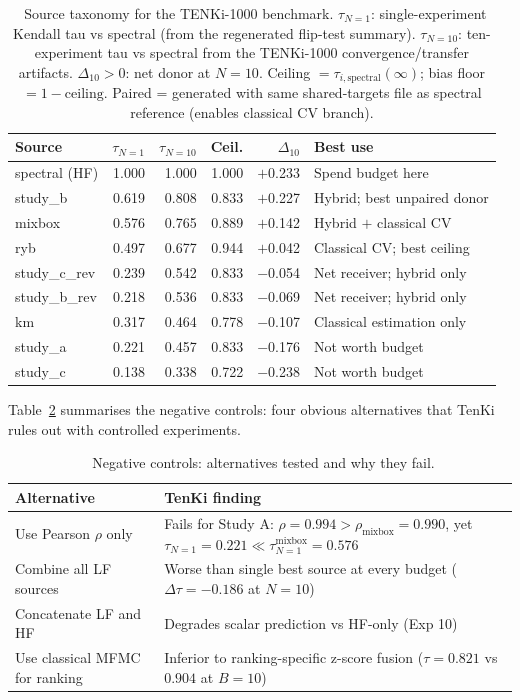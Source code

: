 \documentclass[twoside,twocolumn,9pt]{article}
\begin{document}
\begin{table}[h]
\small
\caption{\ Source taxonomy for the TENKi-1000 benchmark. $\tau_{N=1}$: single-experiment Kendall tau vs spectral (from the regenerated flip-test summary). $\tau_{N=10}$: ten-experiment tau vs spectral from the TENKi-1000 convergence/transfer artifacts. $\Delta_{10} > 0$: net donor at $N=10$. Ceiling $= \tau_{i,\mathrm{spectral}}(\infty)$; bias floor $= 1 - \mathrm{ceiling}$. Paired = generated with same shared-targets file as spectral reference (enables classical CV branch).}
\label{tab:source_taxonomy}
\begin{tabular*}{0.48\textwidth}{@{\extracolsep{\fill}}lrrrrl}
\hline
\textbf{Source} & $\tau_{N=1}$ & $\tau_{N=10}$ & \textbf{Ceil.} & $\Delta_{10}$ & \textbf{Best use} \\
\hline
spectral (HF)   & 1.000 & 1.000 & 1.000 & $+$0.233 & Spend budget here \\
study\_b        & 0.619 & 0.808 & 0.833 & $+$0.227 & Hybrid; best unpaired donor \\
mixbox          & 0.576 & 0.765 & 0.889 & $+$0.142 & Hybrid $+$ classical CV \\
ryb             & 0.497 & 0.677 & 0.944 & $+$0.042 & Classical CV; best ceiling \\
study\_c\_rev   & 0.239 & 0.542 & 0.833 & $-$0.054 & Net receiver; hybrid only \\
study\_b\_rev   & 0.218 & 0.536 & 0.833 & $-$0.069 & Net receiver; hybrid only \\
km              & 0.317 & 0.464 & 0.778 & $-$0.107 & Classical estimation only \\
study\_a        & 0.221 & 0.457 & 0.833 & $-$0.176 & Not worth budget \\
study\_c        & 0.138 & 0.338 & 0.722 & $-$0.238 & Not worth budget \\
\hline
\end{tabular*}
\end{table}

Table~\ref{tab:negative_controls} summarises the negative controls: four obvious alternatives that TenKi rules out with controlled experiments.

\begin{table}[h]
\small
\caption{\ Negative controls: alternatives tested and why they fail.}
\label{tab:negative_controls}
\begin{tabular*}{0.48\textwidth}{@{\extracolsep{\fill}}p{3.0cm}p{4.5cm}}
\hline
\textbf{Alternative} & \textbf{TenKi finding} \\
\hline
Use Pearson $\rho$ only & Fails for Study A: $\rho=0.994 > \rho_\mathrm{mixbox}=0.990$, yet $\tau_{N=1}=0.221 \ll \tau_{N=1}^\mathrm{mixbox}=0.576$ \\
Combine all LF sources & Worse than single best source at every budget ($\Delta\tau = -0.186$ at $N=10$) \\
Concatenate LF and HF & Degrades scalar prediction vs HF-only (Exp 10) \\
Use classical MFMC for ranking & Inferior to ranking-specific z-score fusion ($\tau=0.821$ vs $0.904$ at $B=10$) \\
\hline
\end{tabular*}
\end{table}
\end{document}
